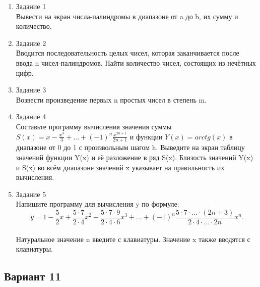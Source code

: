 \documentclass[a4paper]{article}
\begin{document}
	
	\begin{enumerate} 
		\item Задание 1 \\
		Вывести на экран числа-палиндромы в диапазоне от a до b, их сумму и количество.\
		\item Задание 2\\
		Вводится последовательность целых чисел, которая заканчивается после ввода n чисел-палиндромов. Найти количество чисел, состоящих из нечётных цифр.\\
		\item Задание 3 \\
		Возвести произведение первых n простых чисел в степень m.\\
		\item Задание 4 \\ 
		Составьте программу вычисления значения суммы  $S(x)=x-\frac{x^3}{3}+...+(-1)^n\frac{x^{2n+1}}{2n+1}$
		и функции $Y(x)=arctg(x)$ в диапазоне от 0 до 1
		с произвольным шагом h. Выведите на экран таблицу значений функции Y(x) и её разложение в ряд S(x). Близость значений Y(x) и S(x) во всём диапазоне
		значений x указывает на правильность их вычисления.\\
		\item Задание 5 \\
		Напишите программу для вычисления y по формуле:\\
		$$y=1-\frac{5}{2}x+\frac{5\cdot7}{2\cdot4}x^2-\frac{5\cdot7\cdot9}{2\cdot4\cdot6}x^3+...+(-1)^n\frac{5\cdot7\cdot...\cdot(2n+3)}{2\cdot4\cdot...\cdot2n}x^n.$$\\
		Натуральное значение n введите с клавиатуры. Значение x также вводятся с клавиатуры.\\
	
	\end{enumerate}

	\begin{center}
		\subsection*{Вариант 11}
	\end{center}
	
\end{document}
